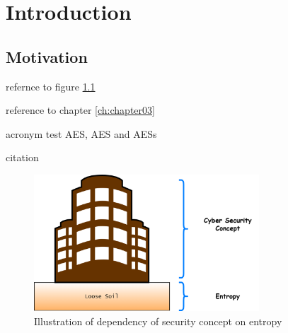 \chapter{Introduction}
\label{ch:intro}



%
%
\section{Motivation}
\label{sec:intro:structure}

refernce to figure \ref{fig:1:1}

reference to chapter \ref{ch:chapter03}

acronym test \acf{AES}, \acs{AES} and \acp{AES}

citation \cite{RANDOM-1998}


\begin{figure}[htbp]
	\centering
	\includegraphics[width=0.75\textwidth]{gfx/diagrams/EffectOfWeakEntropy}
	\caption{Illustration of dependency of security concept on entropy}
	\label{fig:1:1}
\end{figure}






